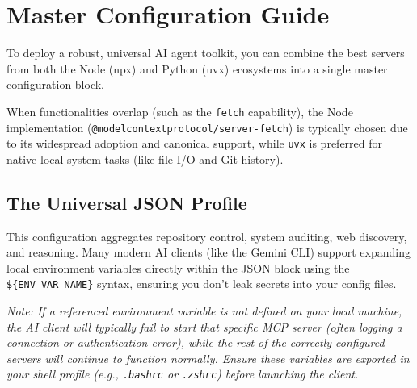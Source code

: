 \newpage
\section{Master Configuration Guide}

To deploy a robust, universal AI agent toolkit, you can combine the best servers from both the Node (npx) and Python (uvx) ecosystems into a single master configuration block. 

When functionalities overlap (such as the \lstinline[style=inline]|fetch| capability), 
the Node implementation (\lstinline[style=inline]|@modelcontextprotocol/server-fetch|) is 
typically chosen due to its widespread adoption and canonical support, 
while \lstinline[style=inline]|uvx| is preferred for native local system tasks 
(like file I/O and Git history).

\subsection{The Universal JSON Profile}
This configuration aggregates repository control, system auditing, web discovery, 
and reasoning. Many modern AI clients (like the Gemini CLI) support expanding local 
environment variables directly within the JSON block using the 
\lstinline[style=inline]|${ENV_VAR_NAME}| syntax, ensuring you don't leak secrets into your config files. 

\textit{Note: If a referenced environment variable is not defined on your local machine, 
the AI client will typically fail to start that specific MCP server (often logging a connection or authentication error), 
while the rest of the correctly configured servers will continue to function normally. 
Ensure these variables are exported in your shell profile 
(e.g., \lstinline[style=inline]|.bashrc| or \lstinline[style=inline]|.zshrc|) before launching the client.}

